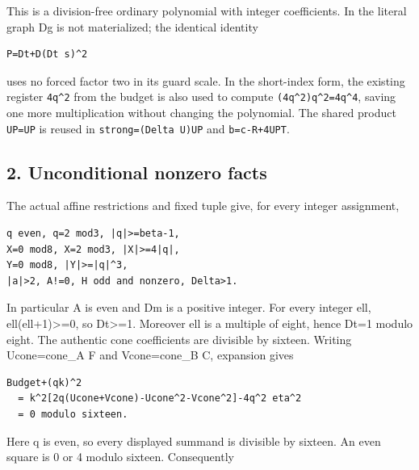 This is a division-free ordinary polynomial with integer coefficients. In the literal graph Dg is not materialized; the identical identity



\begin{verbatim}
P=Dt+D(Dt s)^2
\end{verbatim}

uses no forced factor two in its guard scale. In the short-index form, the existing register \texttt{4q\textasciicircum{}\allowbreak{}2} from the budget is also used to compute \texttt{(4q\textasciicircum{}\allowbreak{}2)q\textasciicircum{}\allowbreak{}2=\allowbreak{}4q\textasciicircum{}\allowbreak{}4}, saving one more multiplication without changing the polynomial. The shared product \texttt{UP=\allowbreak{}U\textasteriskcentered{}\allowbreak{}P} is reused in \texttt{strong=\allowbreak{}(Delta U)\textasteriskcentered{}\allowbreak{}UP} and \texttt{b=\allowbreak{}c-R+\allowbreak{}4UPT}.



\subsection{2. Unconditional nonzero facts}



The actual affine restrictions and fixed tuple give, for every integer assignment,



\begin{verbatim}
q even, q=2 mod3, |q|>=beta-1,
X=0 mod8, X=2 mod3, |X|>=4|q|,
Y=0 mod8, |Y|>=|q|^3,
|a|>2, A!=0, H odd and nonzero, Delta>1.
\end{verbatim}

In particular A is even and Dm is a positive integer. For every integer ell, ell(ell+\allowbreak{}1)\textgreater{}\allowbreak{}=\allowbreak{}0, so Dt\textgreater{}\allowbreak{}=\allowbreak{}1. Moreover ell is a multiple of eight, hence Dt=\allowbreak{}1 modulo eight. The authentic cone coefficients are divisible by sixteen. Writing Ucone=\allowbreak{}cone\_\allowbreak{}A F and Vcone=\allowbreak{}cone\_\allowbreak{}B C, expansion gives



\begin{verbatim}
Budget+(qk)^2
  = k^2[2q(Ucone+Vcone)-Ucone^2-Vcone^2]-4q^2 eta^2
  = 0 modulo sixteen.
\end{verbatim}

Here q is even, so every displayed summand is divisible by sixteen. An even square is 0 or 4 modulo sixteen. Consequently



